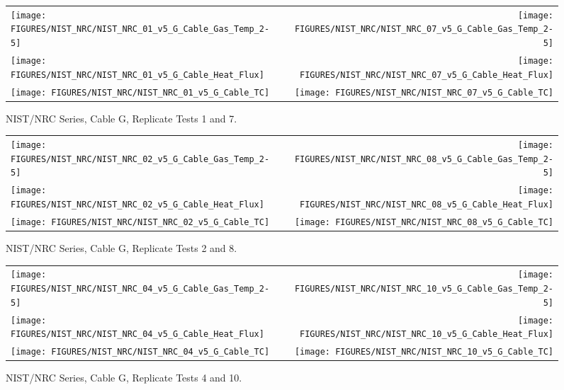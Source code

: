 \clearpage

\vspace{1in}

\begin{figure}[h!]
\begin{tabular*}{\textwidth}{l@{\extracolsep{\fill}}r}
\texttt{[image: FIGURES/NIST\_NRC/NIST\_NRC\_01\_v5\_G\_Cable\_Gas\_Temp\_2-5]} &
\texttt{[image: FIGURES/NIST\_NRC/NIST\_NRC\_07\_v5\_G\_Cable\_Gas\_Temp\_2-5]} \\
\texttt{[image: FIGURES/NIST\_NRC/NIST\_NRC\_01\_v5\_G\_Cable\_Heat\_Flux]} &
\texttt{[image: FIGURES/NIST\_NRC/NIST\_NRC\_07\_v5\_G\_Cable\_Heat\_Flux]} \\
\texttt{[image: FIGURES/NIST\_NRC/NIST\_NRC\_01\_v5\_G\_Cable\_TC]} &
\texttt{[image: FIGURES/NIST\_NRC/NIST\_NRC\_07\_v5\_G\_Cable\_TC]}
\end{tabular*}
\caption{NIST/NRC Series, Cable G, Replicate Tests 1 and 7.}
\label{NIST_NRC_G_1_and_7}
\end{figure}

\begin{figure}[h]
\begin{tabular*}{\textwidth}{l@{\extracolsep{\fill}}r}
\texttt{[image: FIGURES/NIST\_NRC/NIST\_NRC\_02\_v5\_G\_Cable\_Gas\_Temp\_2-5]} &
\texttt{[image: FIGURES/NIST\_NRC/NIST\_NRC\_08\_v5\_G\_Cable\_Gas\_Temp\_2-5]} \\
\texttt{[image: FIGURES/NIST\_NRC/NIST\_NRC\_02\_v5\_G\_Cable\_Heat\_Flux]} &
\texttt{[image: FIGURES/NIST\_NRC/NIST\_NRC\_08\_v5\_G\_Cable\_Heat\_Flux]} \\
\texttt{[image: FIGURES/NIST\_NRC/NIST\_NRC\_02\_v5\_G\_Cable\_TC]} &
\texttt{[image: FIGURES/NIST\_NRC/NIST\_NRC\_08\_v5\_G\_Cable\_TC]}
\end{tabular*}
\caption{NIST/NRC Series, Cable G, Replicate Tests 2 and 8.}
\label{NIST_NRC_G_2_and_8}
\end{figure}

\begin{figure}[h]
\begin{tabular*}{\textwidth}{l@{\extracolsep{\fill}}r}
\texttt{[image: FIGURES/NIST\_NRC/NIST\_NRC\_04\_v5\_G\_Cable\_Gas\_Temp\_2-5]} &
\texttt{[image: FIGURES/NIST\_NRC/NIST\_NRC\_10\_v5\_G\_Cable\_Gas\_Temp\_2-5]} \\
\texttt{[image: FIGURES/NIST\_NRC/NIST\_NRC\_04\_v5\_G\_Cable\_Heat\_Flux]} &
\texttt{[image: FIGURES/NIST\_NRC/NIST\_NRC\_10\_v5\_G\_Cable\_Heat\_Flux]} \\
\texttt{[image: FIGURES/NIST\_NRC/NIST\_NRC\_04\_v5\_G\_Cable\_TC]} &
\texttt{[image: FIGURES/NIST\_NRC/NIST\_NRC\_10\_v5\_G\_Cable\_TC]}
\end{tabular*}
\caption{NIST/NRC Series, Cable G, Replicate Tests 4 and 10.}
\label{NIST_NRC_G_4_and_10}
\end{figure}

